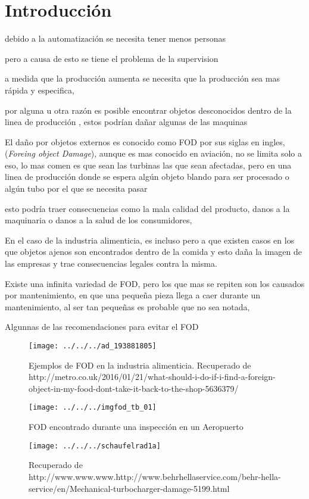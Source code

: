 \chapter{Introducción}\label{intro}

debido a la automatización se necesita tener menos personas

pero a causa de esto se tiene el problema de la supervision

a medida que la producción aumenta se necesita que la producción sea mas rápida y especifica,

por alguna u otra razón es posible encontrar objetos desconocidos dentro de la linea de producción , estos podrían dañar algunas de las maquinas

El daño por objetos externos es conocido como FOD  por sus siglas en ingles, (\textit{Foreing object Damage}), aunque es mas conocido en aviación, no se limita solo a eso, lo mas comen es que sean las turbinas las que sean afectadas, pero en una linea de producción donde se espera algún objeto blando para ser procesado o algún tubo por el que se necesita pasar 

esto podría traer consecuencias como la mala calidad del producto, danos a la maquinaria o danos a la salud de los consumidores,

En el caso de la industria alimenticia, es incluso pero a que existen casos en los que objetos ajenos son encontrados dentro de la comida y esto daña la imagen de las empresas y trae consecuencias legales contra la misma.

Existe una infinita variedad de FOD, pero los que mas se repiten son los causados por mantenimiento, en que una pequeña pieza llega a caer durante un mantenimiento, al ser tan pequeñas es probable que no sea notada,

Algunnas de las recomendaciones para evitar el FOD 
\begin{figure}
	\centering
	\texttt{[image: ../../../ad\_193881805]}
	\caption{Ejemplos de FOD en la industria alimenticia.
		Recuperado de http://metro.co.uk/2016/01/21/what-should-i-do-if-i-find-a-foreign-object-in-my-food-dont-take-it-back-to-the-shop-5636379/}
	\label{fig:ad193881805}
\end{figure}
\begin{figure}
	\centering
	\texttt{[image: ../../../imgfod\_tb\_01]}
	\caption{FOD encontrado durante una inspección en un Aeropuerto}
	\label{fig:imgfodtb01}
\end{figure}
\begin{figure}
	\centering
	\texttt{[image: ../../../schaufelrad1a]}
	\caption{ Recuperado de http://www.www.www.http://www.behrhellaservice.com/behr-hella-service/en/Mechanical-turbocharger-damage-5199.html}
	\label{fig:schaufelrad1a}
\end{figure}


